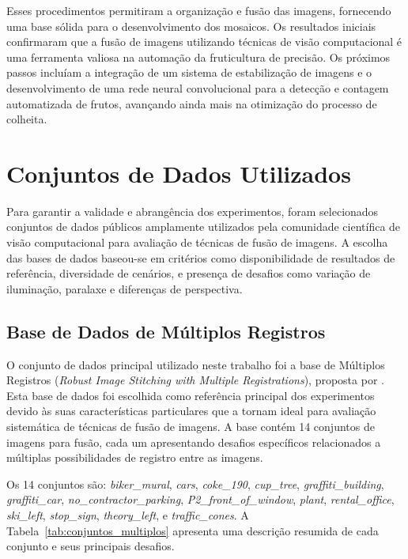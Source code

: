Esses procedimentos permitiram a organização e fusão das imagens, fornecendo uma base sólida para o desenvolvimento dos mosaicos.
Os resultados iniciais confirmaram que a fusão de imagens utilizando técnicas de visão computacional é uma ferramenta valiosa na automação da fruticultura de precisão. Os próximos passos incluíam a integração de um sistema de estabilização de imagens e o desenvolvimento de uma rede neural convolucional para a detecção e contagem automatizada de frutos, avançando ainda mais na otimização do processo de colheita.


\section{Conjuntos de Dados Utilizados}

Para garantir a validade e abrangência dos experimentos, foram selecionados conjuntos de dados públicos amplamente utilizados pela comunidade científica de visão computacional para avaliação de técnicas de fusão de imagens. A escolha das bases de dados baseou-se em critérios como disponibilidade de resultados de referência, diversidade de cenários, e presença de desafios como variação de iluminação, paralaxe e diferenças de perspectiva.

\subsection{Base de Dados de Múltiplos Registros}

O conjunto de dados principal utilizado neste trabalho foi a base de Múltiplos Registros (\textit{Robust Image Stitching with Multiple Registrations}), proposta por \cite{zhang2018robust}. Esta base de dados foi escolhida como referência principal dos experimentos devido às suas características particulares que a tornam ideal para avaliação sistemática de técnicas de fusão de imagens. A base contém 14 conjuntos de imagens para fusão, cada um apresentando desafios específicos relacionados a múltiplas possibilidades de registro entre as imagens.

Os 14 conjuntos são: \textit{biker\_mural}, \textit{cars}, \textit{coke\_190}, \textit{cup\_tree}, \textit{graffiti\_building}, \textit{graffiti\_car}, \textit{no\_contractor\_parking}, \textit{P2\_front\_of\_window}, \textit{plant}, \textit{rental\_office}, \textit{ski\_left}, \textit{stop\_sign}, \textit{theory\_left}, e \textit{traffic\_cones}. A Tabela~\ref{tab:conjuntos_multiplos} apresenta uma descrição resumida de cada conjunto e seus principais desafios.

